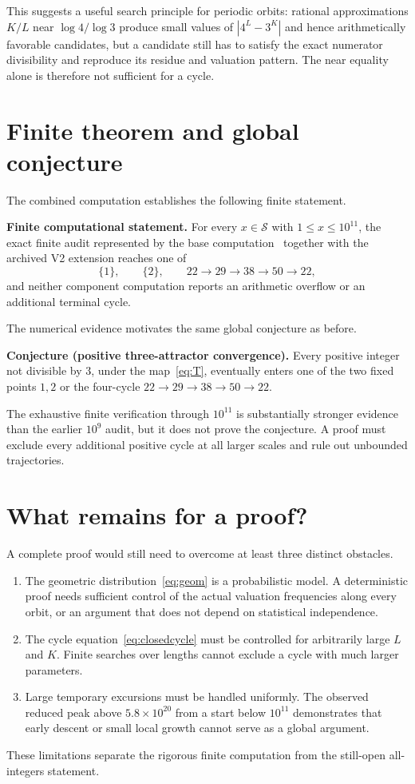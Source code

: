 \documentclass[11pt]{article}
\newcommand{\Sset}{\mathcal S}
\begin{document}
This suggests a useful search principle for periodic orbits: rational approximations $K/L$ near $\log4/\log3$ produce small values of $|4^L-3^K|$ and hence arithmetically favorable candidates, but a candidate still has to satisfy the exact numerator divisibility and reproduce its residue and valuation pattern.  The near equality alone is therefore not sufficient for a cycle.

\section{Finite theorem and global conjecture}
The combined computation establishes the following finite statement.

\medskip
\noindent\textbf{Finite computational statement.}
For every $x\in\Sset$ with $1\le x\le10^{11}$, the exact finite audit represented by the base computation~\cite{banazadeh2026base} together with the archived V2 extension reaches one of
\[
\{1\},\qquad\{2\},\qquad
22\to29\to38\to50\to22,
\]
and neither component computation reports an arithmetic overflow or an additional terminal cycle.
\medskip

The numerical evidence motivates the same global conjecture as before.

\medskip
\noindent\textbf{Conjecture (positive three-attractor convergence).}
Every positive integer not divisible by $3$, under the map~\eqref{eq:T}, eventually enters one of the two fixed points $1,2$ or the four-cycle $22\to29\to38\to50\to22$.
\medskip

The exhaustive finite verification through $10^{11}$ is substantially stronger evidence than the earlier $10^9$ audit, but it does not prove the conjecture.  A proof must exclude every additional positive cycle at all larger scales and rule out unbounded trajectories.

\section{What remains for a proof?}
A complete proof would still need to overcome at least three distinct obstacles.
\begin{enumerate}[leftmargin=2em]
\item The geometric distribution~\eqref{eq:geom} is a probabilistic model.  A deterministic proof needs sufficient control of the actual valuation frequencies along every orbit, or an argument that does not depend on statistical independence.
\item The cycle equation~\eqref{eq:closedcycle} must be controlled for arbitrarily large $L$ and $K$.  Finite searches over lengths cannot exclude a cycle with much larger parameters.
\item Large temporary excursions must be handled uniformly.  The observed reduced peak above $5.8\times10^{20}$ from a start below $10^{11}$ demonstrates that early descent or small local growth cannot serve as a global argument.
\end{enumerate}
These limitations separate the rigorous finite computation from the still-open all-integers statement.
\end{document}
